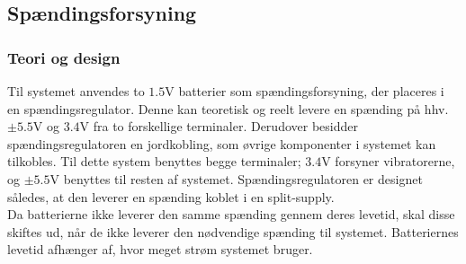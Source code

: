 \subsection{Spændingsforsyning}\label{Spaendingsforsying}
\subsubsection{Teori og design}
Til systemet anvendes to $1.5$V batterier som spændingsforsyning, der placeres i en spændingsregulator. Denne kan teoretisk og reelt levere en spænding på hhv. $\pm5.5$V og $3.4$V fra to forskellige terminaler. Derudover besidder spændingsregulatoren en jordkobling, som øvrige komponenter i systemet kan tilkobles. Til dette system benyttes begge terminaler; $3.4$V forsyner vibratorerne, og $\pm5.5$V benyttes til resten af systemet. Spændingsregulatoren er designet således, at den leverer en spænding koblet i en split-supply.\\%
Da batterierne ikke leverer den samme spænding gennem deres levetid, skal disse skiftes ud, når de ikke leverer den nødvendige spænding til systemet. Batteriernes levetid afhænger af, hvor meget strøm systemet bruger. %

